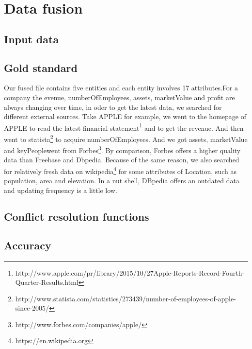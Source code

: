 \section{Data fusion}
\subsection{Input data}



\subsection{Gold standard}
Our fused file contains five entities and each entity involves 17 attributes.For a company the evenue, numberOfEmployees, assets, marketValue and profit are always changing over time, in oder to get the latest data, we searched for different external sources. Take APPLE for example, we went to the homepage of APPLE  to read the latest financial statement\footnote{http://www.apple.com/pr/library/2015/10/27Apple-Reports-Record-Fourth-Quarter-Results.html} and to get the revenue. And then went to statista\footnote{http://www.statista.com/statistics/273439/number-of-employees-of-apple-since-2005/} to acquire numberOfEmployees. And we got assets, marketValue and keyPeoplewent from Forbes\footnote{http://www.forbes.com/companies/apple/}. By comparison, Forbes offers a higher quality data than Freebase and Dbpedia. Because of the same reason, we also searched for relatively fresh data on wikipedia\footnote{https://en.wikipedia.org} for some attributes of Location, such as population, area and elevation. In a nut shell, DBpedia offers an outdated data and updating frequency is a little low. 


\subsection{Conflict resolution functions}


\subsection{Accuracy}
